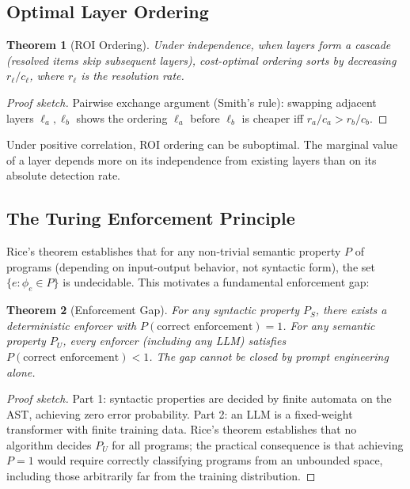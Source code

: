 \documentclass[11pt, a4paper, logo, copyright]{googledeepmind}
\newtheorem{theorem}{Theorem}[section]
\begin{document}
\subsection{Optimal Layer Ordering}

\begin{theorem}[ROI Ordering]
\label{thm:roi-ordering}
Under independence, when layers form a cascade (resolved items skip subsequent layers), cost-optimal ordering sorts by decreasing $r_\ell / c_\ell$, where $r_\ell$ is the resolution rate.
\end{theorem}

\begin{proof}[Proof sketch]
Pairwise exchange argument (Smith's rule): swapping adjacent layers $\ell_a, \ell_b$ shows the ordering $\ell_a$ before $\ell_b$ is cheaper iff $r_a / c_a > r_b / c_b$.
\end{proof}

Under positive correlation, ROI ordering can be suboptimal. The marginal value of a layer depends more on its independence from existing layers than on its absolute detection rate.

\subsection{The Turing Enforcement Principle}

Rice's theorem establishes that for any non-trivial semantic property $P$ of programs (depending on input-output behavior, not syntactic form), the set $\{e : \phi_e \in P\}$ is undecidable. This motivates a fundamental enforcement gap:

\begin{theorem}[Enforcement Gap]
\label{thm:enforcement-gap}
For any syntactic property $P_S$, there exists a deterministic enforcer with $P(\text{correct enforcement}) = 1$. For any semantic property $P_U$, every enforcer (including any LLM) satisfies $P(\text{correct enforcement}) < 1$. The gap cannot be closed by prompt engineering alone.
\end{theorem}

\begin{proof}[Proof sketch]
Part 1: syntactic properties are decided by finite automata on the AST, achieving zero error probability. Part 2: an LLM is a fixed-weight transformer with finite training data. Rice's theorem establishes that no algorithm decides $P_U$ for all programs; the practical consequence is that achieving $P = 1$ would require correctly classifying programs from an unbounded space, including those arbitrarily far from the training distribution.
\end{proof}
\end{document}
